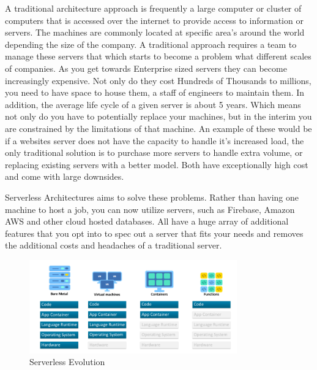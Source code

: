 A traditional architecture approach is frequently a large computer or cluster of computers that is accessed over the internet to provide access to information or servers. The machines are commonly located at specific area's around the world depending the size of the company. A traditional approach requires a team to manage these servers that which starts to become a problem what different scales of companies. As you get towards Enterprise sized servers they can become increasingly expensive. Not only do they cost Hundreds of Thousands to millions, you need to have space to house them, a staff of engineers to maintain them. In addition, the average life cycle of a given server is about 5 years. Which means not only do you have to potentially replace your machines, but in the interim you are constrained by the limitations of that machine.\newline
An example of these would be if a websites server does not have the capacity to handle it's increased load, the only traditional solution is to purchase more servers to handle extra volume, or replacing existing servers with a better model. Both have exceptionally high cost and come with large downsides.\newline
\newpage

Serverless Architectures aims to solve these problems. Rather than having one machine to host a job, you can now utilize servers, such as Firebase, Amazon AWS and other cloud hosted databases. All have a huge array of additional features that you opt into to spec out a server that fits your needs and removes the additional costs and headaches of a traditional server.

\begin{figure}[h!]
	\caption{Serverless Evolution}
	\label{image:myImageName}
	\centering
	\includegraphics[width=0.8\textwidth]{Images/serverless_evolution.png}
\end{figure}




